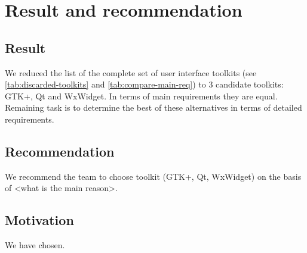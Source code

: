 \section{Result and recommendation}

\subsection{Result}

We reduced the list of the complete set of user interface toolkits (see
\ref{tab:discarded-toolkits} and \ref{tab:compare-main-req}) to 3
candidate toolkits: GTK+, Qt and WxWidget. In terms of main requirements they
are equal. Remaining task is to determine the best of these alternatives in
terms of detailed requirements. 

\subsection{Recommendation}
We recommend the team to choose toolkit (GTK+, Qt, WxWidget) on the basis
of <what is the main reason>.

\subsection{Motivation}

We have chosen.
